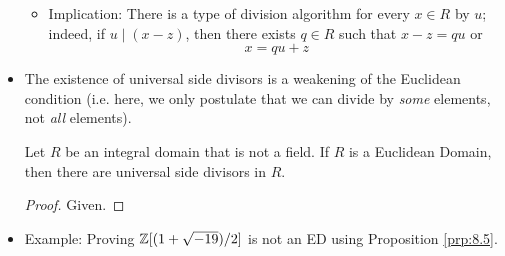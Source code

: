 \documentclass[../notes.tex]{subfiles}
\begin{document}
\begin{itemize}
    \begin{itemize}
        \item Implication: There is a type of division algorithm for every $x\in R$ by $u$; indeed, if $u\mid(x-z)$, then there exists $q\in R$ such that $x-z=qu$ or
        \begin{equation*}
            x = qu+z
        \end{equation*}
    \end{itemize}
    \item The existence of universal side divisors is a weakening of the Euclidean condition (i.e. here, we only postulate that we can divide by \emph{some} elements, not \emph{all} elements).
    \begin{proposition}\label{prp:8.5}
        Let $R$ be an integral domain that is not a field. If $R$ is a Euclidean Domain, then there are universal side divisors in $R$.
        \begin{proof}
            Given.
        \end{proof}
    \end{proposition}
    \item Example: Proving $\mathbb{Z}[(1+\sqrt{-19})/2]$ is not an ED using Proposition \ref{prp:8.5}.
\end{itemize}
\end{document}
